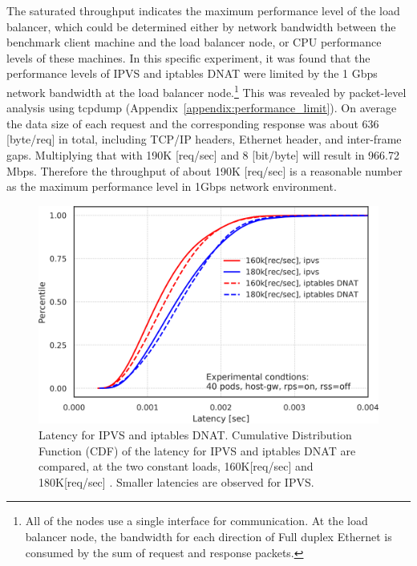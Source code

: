 The saturated throughput indicates the maximum performance level of the load balancer, which could be determined either by network bandwidth between the benchmark client machine and the load balancer node, or CPU performance levels of these machines.
%
In this specific experiment, it was found that the performance levels of IPVS and iptables DNAT were limited by the 1 Gbps network bandwidth at the load balancer node.\footnote{All of the nodes use a single interface for communication. 
At the load balancer node, the bandwidth for each direction of Full duplex Ethernet is consumed by the sum of request and response packets.
}
This was revealed by packet-level analysis using tcpdump (Appendix~\ref{appendix:performance_limit}).
%
On average the data size of each request and the corresponding response was about 636 [byte/req] in total, including TCP/IP headers, Ethernet header, and inter-frame gaps.
Multiplying that with 190K [req/sec] and 8 [bit/byte] will result in 966.72 Mbps.
Therefore the throughput of about 190K [req/sec] is a reasonable number as the maximum performance level in 1Gbps network environment.



\begin{figure}[h]
  \centering
  \includegraphics[width=0.75\columnwidth]{Figs/latency_cdf_rps_40pods}
  \par\bigskip
  \centering
  \begin{minipage}{0.9\columnwidth}
    \caption[Latency for IPVS and iptables DNAT]{
      Latency for IPVS and iptables DNAT.
      Cumulative Distribution Function (CDF) of the latency for IPVS and iptables DNAT are compared, at the two constant loads, 160K[req/sec] and 180K[req/sec] .
      Smaller latencies are observed for IPVS.
}
    \label{fig:latency_cdf_rps_40pods}
  \end{minipage}
\end{figure}

